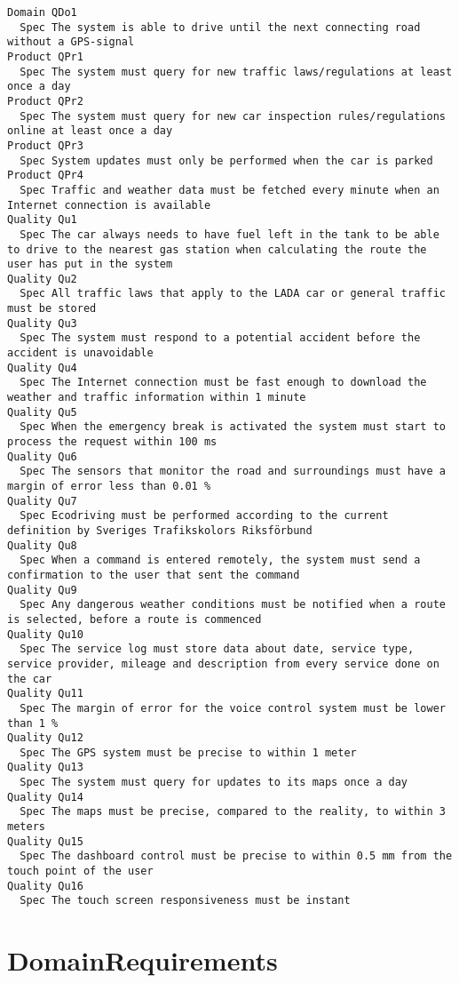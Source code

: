 \begin{lstlisting}
Domain QDo1
  Spec The system is able to drive until the next connecting road without a GPS-signal
Product QPr1
  Spec The system must query for new traffic laws/regulations at least once a day
Product QPr2
  Spec The system must query for new car inspection rules/regulations online at least once a day
Product QPr3
  Spec System updates must only be performed when the car is parked
Product QPr4
  Spec Traffic and weather data must be fetched every minute when an Internet connection is available
Quality Qu1
  Spec The car always needs to have fuel left in the tank to be able to drive to the nearest gas station when calculating the route the user has put in the system
Quality Qu2
  Spec All traffic laws that apply to the LADA car or general traffic must be stored
Quality Qu3
  Spec The system must respond to a potential accident before the accident is unavoidable
Quality Qu4
  Spec The Internet connection must be fast enough to download the weather and traffic information within 1 minute
Quality Qu5
  Spec When the emergency break is activated the system must start to process the request within 100 ms
Quality Qu6
  Spec The sensors that monitor the road and surroundings must have a margin of error less than 0.01 %
Quality Qu7
  Spec Ecodriving must be performed according to the current definition by Sveriges Trafikskolors Riksförbund
Quality Qu8
  Spec When a command is entered remotely, the system must send a confirmation to the user that sent the command
Quality Qu9
  Spec Any dangerous weather conditions must be notified when a route is selected, before a route is commenced
Quality Qu10
  Spec The service log must store data about date, service type, service provider, mileage and description from every service done on the car
Quality Qu11
  Spec The margin of error for the voice control system must be lower than 1 %
Quality Qu12
  Spec The GPS system must be precise to within 1 meter
Quality Qu13
  Spec The system must query for updates to its maps once a day
Quality Qu14
  Spec The maps must be precise, compared to the reality, to within 3 meters
Quality Qu15
  Spec The dashboard control must be precise to within 0.5 mm from the touch point of the user
Quality Qu16
  Spec The touch screen responsiveness must be instant

\end{lstlisting}
    
        
       \section{DomainRequirements}


